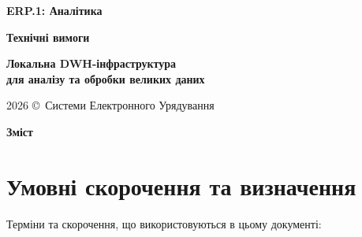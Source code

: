 \documentclass{article}
\newcommand\HUGE[1]{\fontsize{38}{38}\selectfont #1}
\begin{document}
\pagestyle{fancy}

\begin{titlepage}
\AddToShipoutPictureBG*{\AtPageLowerLeft{\color{primary}\rule{\paperwidth}{\paperheight}}}
\color{white}\thispagestyle{empty}\vspace*{4cm}\centering
  {\Huge \textbf{ERP.1: Аналітика} \par} \vspace{2cm}
  {\HUGE \textbf{Технічні вимоги} \par} \vspace{2.5cm}
  {\LARGE \textbf{Локальна DWH-інфраструктура \\ для аналізу та обробки великих даних} \par} \vspace{2.5cm}
\vfill
  {\large 2026 \copyright\ Системи Електронного Урядування \par}
\end{titlepage}

\newpage
\begin{center}
  {\Huge\color{primary}\bfseries Зміст\par}
\end{center}
\vspace{40pt}
\tableofcontents

\newpage
\begin{abstract}
У цьому документі наведено детальні технічні вимоги до підсистеми ERP.1: Аналітика, яка розробляється як сучасний високопродуктивний сервіс локального сховища великих даних (DWH), аналітичних обчислень та побудови бізнес-звітів (BI). Платформа інтегрується з децентралізованою екосистемою ERP.1 та передбачає локальне виконання швидких OLAP-запитів без передачі конфіденційної інформації за межі установ. Архітектурні вимоги фокусуються на використанні C99-сумісних мінімалістичних технологій без застосування екосистеми Rust, з повною інтеграцією в Erlang/OTP середовище периферійних вузлів. Документ визначає апаратний стек, вимоги безпеки відповідно до КСЗІ та NIST SP 800-53, а також містить порівняльний аналіз цільових інструментів для вибору рішення.
\end{abstract}

\newpage
\section{Умовні скорочення та визначення}

Терміни та скорочення, що використовуються в цьому документі:
\end{document}
